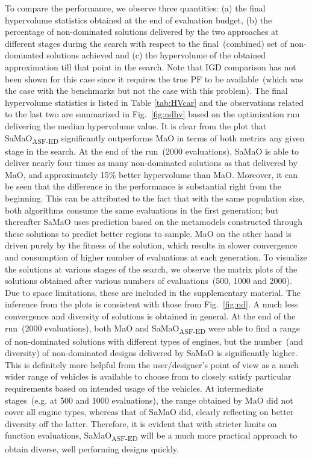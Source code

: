 \documentclass[twocolumn,10pt]{asme2ej}
\begin{document}
{To compare the performance, we observe three quantities: (a) the final hypervolume statistics obtained at the end of evaluation budget, (b) the percentage of non-dominated solutions delivered by the two approaches at different stages during the search with respect to the final~(combined) set of non-dominated solutions achieved and (c) the hypervolume of the obtained approximation till that point in the search. Note that IGD comparison has not been shown for this case since it requires the true PF to be available~(which was the case with the benchmarks but not the case with this problem). The final hypervolume statistics is listed in Table \ref{tab:HVcar} and the observations related to the last two are summarized in Fig.~\ref{fig:ndhv} based on the optimization run delivering the median hypervolume value. It is clear from the plot that SaMaO\textsubscript{ASF-ED} significantly outperforms MaO in terms of both metrics any given stage in the search. At the end of the run~(2000 evaluations), SaMaO is able to deliver nearly four times as many non-dominated solutions as that delivered by MaO, and approximately 15\% better hypervolume than MaO. Moreover, it can be seen that the difference in the performance is substantial right from the beginning. This can be attributed to the fact that with the same population size, both algorithms consume the same evaluations in the first generation; but thereafter SaMaO uses prediction based on the metamodels constructed through these solutions to predict better regions to sample. MaO on the other hand is driven purely by the fitness of the solution, which results in slower convergence and consumption of higher number of evaluations at each generation.  To visualize the solutions at various stages of the search, we observe the matrix plots of the solutions obtained after various numbers of evaluations~(500, 1000 and 2000). Due to space limitations, these are included in the supplementary material. The inference from the plots is consistent with those from Fig.~\ref{fig:nd}. A much less convergence and diversity of solutions is obtained in general. At the end of the run~(2000 evaluations), both MaO and SaMaO\textsubscript{ASF-ED} were able to find a range of non-dominated solutions with different types of engines, but the number~(and diversity) of non-dominated designs delivered by SaMaO is significantly higher. This is definitely more helpful from the user/designer's point of view as a much wider range of vehicles is available to choose from to closely satisfy particular requirements based on intended usage of the vehicles. At intermediate stages~(e.g. at 500 and 1000 evaluations), the range obtained by MaO did not cover all engine types, whereas that of SaMaO did, clearly reflecting on better diversity off the latter. Therefore, it is evident that with stricter limits on function evaluations, SaMaO\textsubscript{ASF-ED} will be a much more practical approach to obtain diverse, well performing designs quickly.} 
\end{document}
